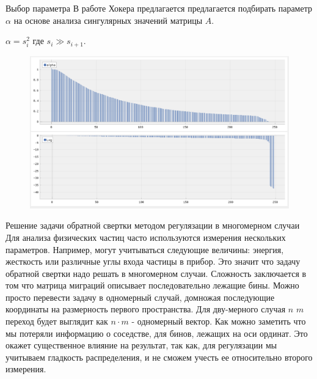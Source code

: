 \documentclass[fullscreen=true,russian,compress,%
	hyperref={unicode,bookmarks=false}]{presentation}
\begin{document}
\begin{frame}{Выбор параметра \alpha}
   В работе Хокера предлагается предлагается подбирать параметр $\alpha$ на основе анализа сингулярных значений матрицы $A$. 
   
   $\alpha = s^2_{i}$ где $ s_{i} \gg s_{i+1} $. 
   \begin{figure}[h]
      \includegraphics[width=\linewidth]{images/alpha.png}
      \label{photo:alpha}
   \end{figure}
\end{frame}


\begin{frame}{Решение задачи обратной свертки методом регулязации в многомерном случаи}
   Для анализа физических частиц часто используются измерения нескольких параметров. Например, могут учитываться следующие величины: 
   энергия, жесткость или различные углы входа частицы в прибор. Это значит что задачу обратной свертки надо решать в многомерном 
   случаи. Сложность заключается в том что матрица миграций описывает последовательно лежащие бины. Можно просто перевести задачу 
   в одномерный случай, домножая последующие координаты на размерность первого пространства. Для дву-мерного случая $n$ $m$ переход 
   будет выглядит как $n \cdot m$ - одномерный вектор. Как можно заметить что мы потеряли информацию о соседстве, для бинов, лежащих на
   оси ординат. Это окажет существенное влияние на результат, так как, для регулязации мы учитываем гладкость распределения, и не 
   сможем учесть ее относительно второго измерения.
\end{frame}
\end{document}

